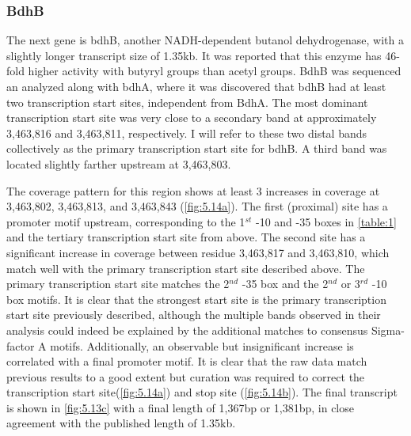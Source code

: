 \subsubsection{BdhB}
The next gene is bdhB, another NADH-dependent butanol dehydrogenase, with a slightly longer transcript size of 1.35kb. It was reported that this enzyme has 46-fold higher activity with butyryl groups than acetyl groups\cite{71,73}. BdhB was sequenced an analyzed along with bdhA, where it was discovered that bdhB had at least two transcription start sites, independent from BdhA. The most dominant transcription start site was very close to a secondary band at approximately 3,463,816 and 3,463,811, respectively\cite{73}. I will refer to these two distal bands collectively as the primary transcription start site for bdhB. A third band was located slightly farther upstream at 3,463,803\cite{73}. 

The coverage pattern for this region shows at least 3 increases in coverage at 3,463,802, 3,463,813, and 3,463,843 (\ref{fig:5.14a}). The first (proximal) site has a promoter motif upstream, corresponding to the 1$^{st}$ -10 and -35 boxes in \ref{table:1} and the tertiary transcription start site from above\cite{72}. The second site has a significant increase in coverage between residue 3,463,817 and 3,463,810, which match well with the primary transcription start site described above\cite{73}. The primary transcription start site matches the 2$^{nd}$  -35 box and the 2$^{nd}$ or 3$^{rd}$ -10 box motifs\cite{73}. It is clear that the strongest start site is the primary transcription start site previously described\cite{73}, although the multiple bands observed in their analysis could indeed be explained by the additional matches to consensus Sigma-factor A motifs. Additionally, an observable but insignificant increase is correlated with a final promoter motif. It is clear that the raw data match previous results to a good extent but curation was required to correct the transcription start site(\ref{fig:5.14a}) and stop site (\ref{fig:5.14b}). The final transcript is shown in \ref{fig:5.13c} with a final length of 1,367bp or 1,381bp, in close agreement with the published length of 1.35kb.

